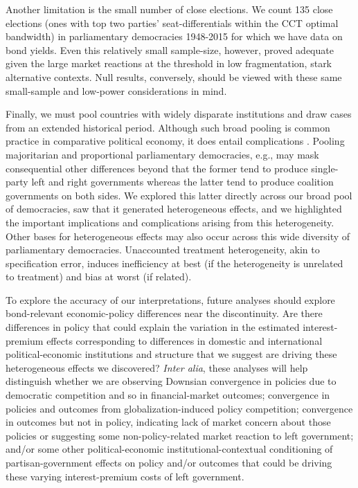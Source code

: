 \documentclass[12pt]{article}
\begin{document}
Another limitation is the small number of close elections. We count 135 close elections (ones with top two parties' seat-differentials within the CCT optimal bandwidth) in parliamentary democracies 1948-2015 for which we have data on bond yields. Even this relatively small sample-size, however, proved adequate given the large market reactions at the threshold in low fragmentation, stark alternative contexts. Null results, conversely, should be viewed with these same small-sample and low-power considerations in mind. 

Finally, we must pool countries with widely disparate institutions and draw cases from an extended historical period. Although such broad pooling is common practice in comparative political economy, it does entail complications \citep{Beck1995}. Pooling majoritarian and proportional parliamentary democracies, e.g., may mask consequential other differences beyond that the former tend to produce single-party left and right governments whereas the latter tend to produce coalition governments on both sides. We explored this latter directly across our broad pool of democracies, saw that it generated heterogeneous effects, and we highlighted the important implications and complications arising from this heterogeneity. Other bases for heterogeneous effects may also occur across this wide diversity of parliamentary democracies. Unaccounted treatment heterogeneity, akin to specification error, induces inefficiency at best (if the heterogeneity is unrelated to treatment) and bias at worst (if related). 

To explore the accuracy of our interpretations, future analyses should explore bond-relevant economic-policy differences near the discontinuity. Are there differences in policy that could explain the variation in the estimated interest-premium effects corresponding to differences in domestic and international political-economic institutions and structure that we suggest are driving these heterogeneous effects we discovered? \textit{Inter alia}, these analyses will help distinguish whether we are observing Downsian convergence in policies due to democratic competition and so in financial-market outcomes; convergence in policies and outcomes from globalization-induced policy competition; convergence in outcomes but not in policy, indicating lack of market concern about those policies or suggesting some non-policy-related market reaction to left government; and/or some other political-economic institutional-contextual conditioning of partisan-government effects on policy and/or outcomes that could be driving these varying interest-premium costs of left government.
\end{document}
